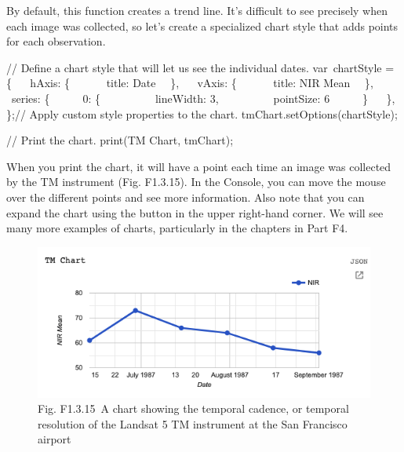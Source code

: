 \documentclass[
  letterpaper,
  DIV=11,
  numbers=noendperiod]{scrreprt}
\newenvironment{Shaded}{\begin{snugshade}}{\end{snugshade}}
\newcommand{\CommentTok}[1]{\textcolor[rgb]{0.37,0.37,0.37}{#1}}
\newcommand{\DataTypeTok}[1]{\textcolor[rgb]{0.68,0.00,0.00}{#1}}
\newcommand{\DecValTok}[1]{\textcolor[rgb]{0.68,0.00,0.00}{#1}}
\newcommand{\ErrorTok}[1]{\textcolor[rgb]{0.68,0.00,0.00}{#1}}
\newcommand{\FunctionTok}[1]{\textcolor[rgb]{0.28,0.35,0.67}{#1}}
\newcommand{\NormalTok}[1]{\textcolor[rgb]{0.00,0.23,0.31}{#1}}
\newcommand{\OperatorTok}[1]{\textcolor[rgb]{0.37,0.37,0.37}{#1}}
\newcommand{\StringTok}[1]{\textcolor[rgb]{0.13,0.47,0.30}{#1}}
\begin{document}
By default, this function creates a trend line. It's difficult to see
precisely when each image was collected, so let's create a specialized
chart style that adds points for each observation.

\begin{Shaded}
\begin{Highlighting}[]
\CommentTok{// Define a chart style that will let us see the individual dates.  }
\NormalTok{var chartStyle }\OperatorTok{=}\NormalTok{ \{  }
  \DataTypeTok{ hAxis}\OperatorTok{:}\NormalTok{ \{  }
      \DataTypeTok{ title}\OperatorTok{:} \StringTok{\textquotesingle{}Date\textquotesingle{}}\NormalTok{   \}}\OperatorTok{,}  
  \DataTypeTok{ vAxis}\OperatorTok{:}\NormalTok{ \{  }
      \DataTypeTok{ title}\OperatorTok{:} \StringTok{\textquotesingle{}NIR Mean\textquotesingle{}}\NormalTok{   \}}\OperatorTok{,}  
  \DataTypeTok{ series}\OperatorTok{:}\NormalTok{ \{      }\DataTypeTok{ 0}\OperatorTok{:}\NormalTok{ \{  }
          \DataTypeTok{ lineWidth}\OperatorTok{:} \DecValTok{3}\OperatorTok{,}  
          \DataTypeTok{ pointSize}\OperatorTok{:} \DecValTok{6}\ErrorTok{ }\NormalTok{      \}  }
\NormalTok{   \}}\OperatorTok{,}  
\NormalTok{\}}\OperatorTok{;}\CommentTok{// Apply custom style properties to the chart.  }
\NormalTok{tmChart}\OperatorTok{.}\FunctionTok{setOptions}\NormalTok{(chartStyle)}\OperatorTok{;}  
  
\CommentTok{// Print the chart.  }
\FunctionTok{print}\NormalTok{(}\StringTok{\textquotesingle{}TM Chart\textquotesingle{}}\OperatorTok{,}\NormalTok{ tmChart)}\OperatorTok{;}
\end{Highlighting}
\end{Shaded}

When you print the chart, it will have a point each time an image was
collected by the TM instrument (Fig. F1.3.15). In the Console, you can
move the mouse over the different points and see more information. Also
note that you can expand the chart using the button in the upper
right-hand corner. We will see many more examples of charts,
particularly in the chapters in Part F4.

\begin{figure}

{\centering \includegraphics{./F1/image47.png}

}

\caption{Fig. F1.3.15~A chart showing the temporal cadence, or temporal
resolution of the Landsat 5 TM instrument at the San Francisco airport}

\end{figure}
\end{document}
